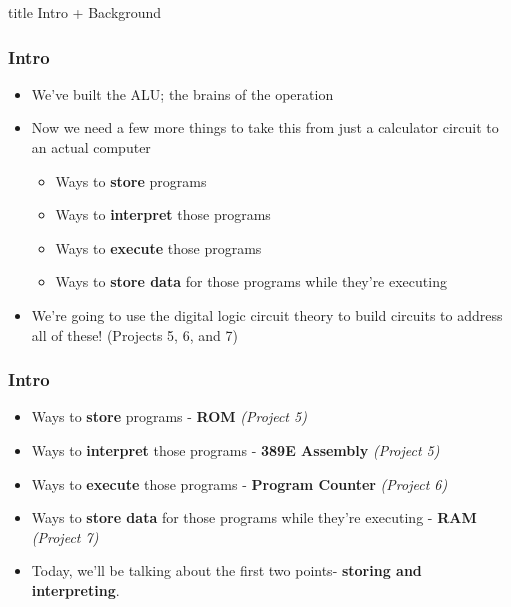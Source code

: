 \documentclass{beamer}
\begin{document}
    	\begin{frame}
                \vfill
                \centering
                \begin{beamercolorbox}[sep=8pt,center,shadow=true,rounded=true]{title}
                    Intro + Background\par%
                \end{beamercolorbox}
                \vfill
             \end{frame}
    
    		\begin{frame}
    			\frametitle{Intro}
    			\begin{itemize}
    				\item We've built the ALU; the brains of the operation
    				\item Now we need a few more things to take this from just a calculator circuit to an actual computer
    				\begin{itemize}
    					\item Ways to \textbf{store} programs
    					\item Ways to \textbf{interpret} those programs
    					\item Ways to \textbf{execute} those programs
    					\item Ways to \textbf{store data} for those programs while they're executing
    				\end{itemize}
    				\item We're going to use the digital logic circuit theory to build circuits to address all of these! (Projects 5, 6, and 7)
    			\end{itemize}
    		\end{frame}
    		
    		\begin{frame}
    			\frametitle{Intro}
    			
    				\begin{itemize}
    					\item Ways to \textbf{store} programs - \textbf{ROM} \textit{(Project 5)}
    					\item Ways to \textbf{interpret} those programs - \textbf{389E Assembly} \textit{(Project 5)}
    					\item Ways to \textbf{execute} those programs - \textbf{Program Counter} \textit{(Project 6)}
    					\item Ways to \textbf{store data} for those programs while they're executing - \textbf{RAM} \textit{(Project 7)}
    					\item Today, we'll be talking about the first two points- \textbf{storing and interpreting}.
    				\end{itemize}
    				
    			
    		\end{frame}
    		
\end{document}
